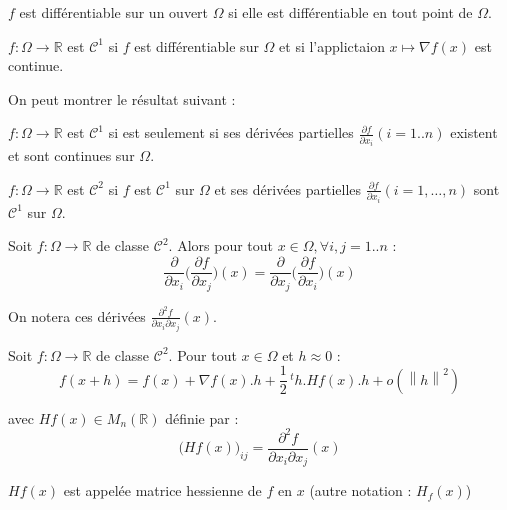\documentclass[a4paper,11pt]{article}
\newcommand{\R}{\mathbb{R}}
\newcommand{\norm}[1]{\left\lVert#1\right\rVert}
\newcommand{\tpo}[1]{\,^t#1}
\newcommand{\derpart}[2]{\displaystyle\frac{\partial#1}{\partial #2}}
\theoremstyle{plain} %
\begin{document}
\begin{fdef}
    $f$ est différentiable sur un ouvert $\Omega$ si elle est différentiable en tout point
    de $\Omega$.
\end{fdef}

\begin{fdef}
    $f : \Omega \longrightarrow \R$ est $\mathcal{C}^1$ si $f$ est différentiable sur
    $\Omega$ et si l'applictaion $x \mapsto \nabla f(x)$ est continue.
\end{fdef}

On peut montrer le résultat suivant :

\begin{lemme}
    $f : \Omega \longrightarrow \R$ est $\mathcal{C}^1$ si est seulement si ses dérivées
    partielles $\derpart{f}{x_i}(i=1..n)$ existent et sont continues sur $\Omega$.
\end{lemme}

\begin{fdef}
    $f : \Omega \longrightarrow \R$ est $\mathcal{C}^2$ si $f$ est $\mathcal{C}^1$ sur
    $\Omega$ et ses dérivées partielles $\derpart{f}{x_i}(i=1,\dots,n)$ sont $\mathcal{C}^1$
    sur $\Omega$.
\end{fdef}

\begin{lemme}[de Schwarz]
    Soit $f : \Omega \longrightarrow \R$ de classe $\mathcal{C}^2$. Alors pour tout $x \in
    \Omega, \forall i,j = 1..n$ : 
    \[
        \frac{\partial}{\partial x_i} \Big( \derpart{f}{x_j} \Big) (x) =
        \frac{\partial}{\partial x_j} \Big( \derpart{f}{x_i} \Big) (x)
    \]
\end{lemme}

\begin{remark}
    On notera ces dérivées $\derpart{^2f}{x_i \partial x_j}(x)$.
\end{remark}

\begin{ftheo}
    Soit $f : \Omega \longrightarrow \R$ de classe $\mathcal{C}^2$. Pour tout $x \in \Omega$
    et $h \approx 0$ : 
\[
    f(x+h) = f(x) + \nabla f(x).h + \frac{1}{2} \tpo{h} . Hf(x) . h + o(\norm{h}^2)
\]

    avec $Hf(x) \in M_n(\R)$ définie par :
    \[
        \Big( Hf(x) \Big)_{ij} = \derpart{^2f}{x_i \partial x_j}(x)
    \]

    $Hf(x)$ est appelée matrice hessienne de $f$ en $x$ (autre notation : $H_f(x)$)
\end{ftheo}
\end{document}
